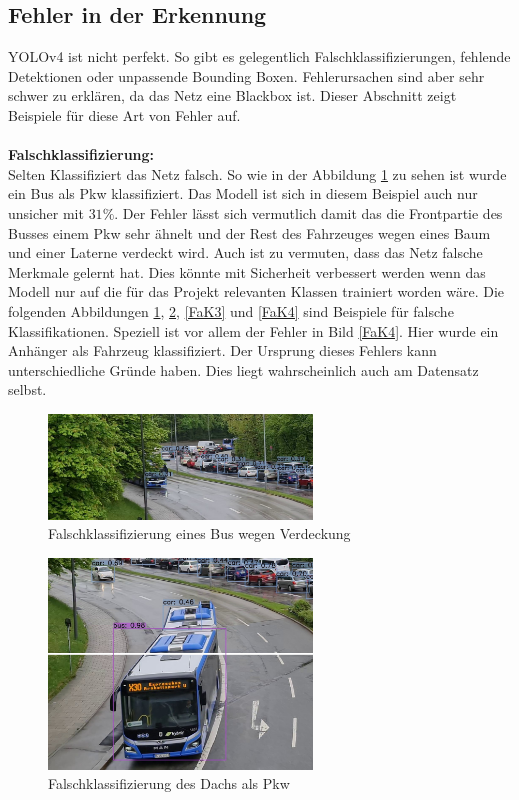 \documentclass[conference]{IEEEtran}
\begin{document}
	\subsection{Fehler in der Erkennung}
	YOLOv4 ist nicht perfekt. So gibt es gelegentlich Falschklassifizierungen, fehlende Detektionen oder unpassende Bounding Boxen.  Fehlerursachen sind aber sehr schwer zu erklären, da das Netz eine Blackbox ist. Dieser Abschnitt zeigt Beispiele für diese Art von Fehler auf.\\
	\\
	\textbf{Falschklassifizierung:}\\
	Selten Klassifiziert das Netz falsch. So wie in der Abbildung \ref{FaK} zu sehen ist wurde ein Bus als Pkw klassifiziert. Das Modell ist sich in diesem Beispiel auch nur unsicher mit $31\%$. Der Fehler lässt sich vermutlich damit das die Frontpartie des Busses einem Pkw sehr ähnelt und der Rest des Fahrzeuges wegen eines Baum und einer Laterne verdeckt wird. Auch ist zu vermuten, dass das Netz falsche Merkmale gelernt hat. Dies könnte mit Sicherheit verbessert werden wenn das Modell nur auf die für das Projekt relevanten Klassen trainiert worden wäre. Die folgenden Abbildungen \ref{FaK}, \ref{FaK2}, \ref{FaK3} und \ref{FaK4} sind Beispiele für falsche Klassifikationen. Speziell ist vor allem der Fehler in Bild \ref{FaK4}. Hier wurde ein Anhänger als Fahrzeug klassifiziert. Der Ursprung dieses Fehlers kann unterschiedliche Gründe haben. Dies liegt wahrscheinlich auch am Datensatz selbst.
	\begin{figure}[!h]
		\begin{center}
			\includegraphics[width=7cm]{Media/Output_480 - Kopie.jpg}
			\caption{Falschklassifizierung eines Bus wegen Verdeckung}
			\label{FaK}
		\end{center}
	\end{figure}
	\begin{figure}[!h]
		\begin{center}
			\includegraphics[width=7cm]{Media/Output_847 - Kopie.jpg}
			\caption{Falschklassifizierung des Dachs als Pkw}
			\label{FaK2}
		\end{center}
	\end{figure}
\end{document}
